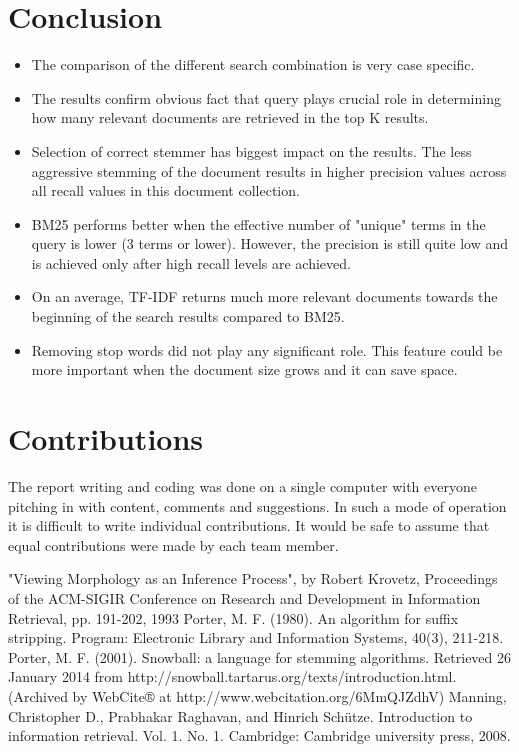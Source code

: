\documentclass[report,draft*]{aaltoseries}
\begin{document}
\section{Conclusion}
\begin{itemize}
\item The comparison of the different search combination is very case specific.
\item The results confirm obvious fact that query plays crucial role in determining how many relevant documents are retrieved in the top K results. 
\item Selection of correct stemmer has biggest impact on the results.  The less aggressive stemming of the document results in higher precision values across all recall values in this document collection.
\item BM25 performs better when the effective number of "unique" terms in the query is lower (3 terms or lower). However, the precision is still quite low and is achieved only after high recall levels are achieved.
\item On an average, TF-IDF returns much more relevant documents towards the beginning of the search results compared to BM25.
\item Removing stop words did not play any significant role. This feature could be more important when the document size grows and it can save space.

\end{itemize}
\section{Contributions}
The report writing and coding was done on a single computer with everyone pitching in with content, comments and suggestions. In such a mode of operation it is difficult to write individual contributions. It would be safe to assume that equal contributions were made by each team member.




\begin{thebibliography}{5}
%
"Viewing Morphology as an Inference Process", by Robert Krovetz, Proceedings of the ACM-SIGIR Conference on Research 
and Development in Information Retrieval, pp. 191-202, 1993
Porter, M. F. (1980). An algorithm for suffix stripping. Program: Electronic Library and Information Systems, 40(3), 211-218. 
Porter, M. F. (2001). Snowball: a language for stemming algorithms. Retrieved 26 January 2014 from http://snowball.tartarus.org/texts/introduction.html. (Archived by WebCite® at http://www.webcitation.org/6MmQJZdhV)
Manning, Christopher D., Prabhakar Raghavan, and Hinrich Schütze. Introduction to information retrieval. Vol. 1. No. 1. Cambridge: Cambridge university press, 2008.


\end{thebibliography}
\end{document}
